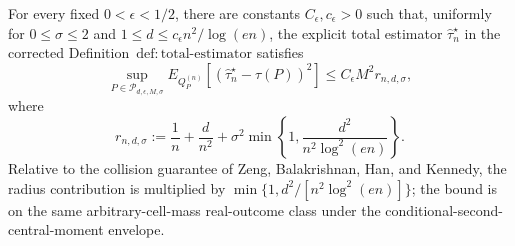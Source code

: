 For every fixed \(0<\epsilon<1/2\), there are constants \(C_{\epsilon},c_{\epsilon}>0\) such that, uniformly for \(0\le\sigma\le2\) and \(1\le d\le c_{\epsilon}n^2/\log(en)\), the explicit total estimator \(\widehat\tau_n^{\star}\) in the corrected Definition~\(\mathrm{def:total\text{-}estimator}\) satisfies
\[
 \sup_{P\in\mathcal P_{d,\epsilon,M,\sigma}}
 E_{Q_P^{(n)}}[(\widehat\tau_n^{\star}-\tau(P))^2]
 \le C_{\epsilon}M^2r_{n,d,\sigma},
\]
where
\[
 r_{n,d,\sigma}:=\frac1n+\frac d{n^2}
 +\sigma^2\min\left\{1,\frac{d^2}{n^2\log^2(en)}\right\}.
\]
Relative to the collision guarantee of Zeng, Balakrishnan, Han, and Kennedy, the radius contribution is multiplied by \(\min\{1,d^2/[n^2\log^2(en)]\}\); the bound is on the same arbitrary-cell-mass real-outcome class under the conditional-second-central-moment envelope.